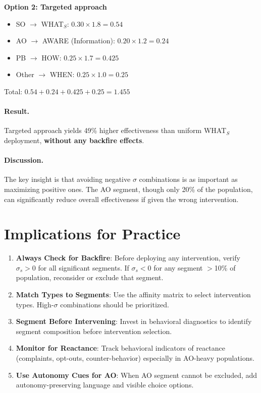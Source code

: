 \textbf{Option 2: Targeted approach}
\begin{itemize}
\item SO $\rightarrow$ WHAT$_S$: $0.30 \times 1.8 = 0.54$
\item AO $\rightarrow$ AWARE (Information): $0.20 \times 1.2 = 0.24$
\item PB $\rightarrow$ HOW: $0.25 \times 1.7 = 0.425$
\item Other $\rightarrow$ WHEN: $0.25 \times 1.0 = 0.25$
\end{itemize}
Total: $0.54 + 0.24 + 0.425 + 0.25 = 1.455$

\paragraph{Result.} Targeted approach yields 49\% higher effectiveness than uniform
WHAT$_S$ deployment, \textbf{without any backfire effects}.

\paragraph{Discussion.} The key insight is that avoiding negative $\sigma$
combinations is as important as maximizing positive ones. The AO segment, though
only 20\% of the population, can significantly reduce overall effectiveness if
given the wrong intervention.


\section{Implications for Practice}
\label{sec:qq-practice}

\begin{tcolorbox}[colback=green!5!white, colframe=green!75!black,
    title=Practical Implications]
\begin{enumerate}
\item \textbf{Always Check for Backfire}: Before deploying any intervention,
verify $\sigma_s > 0$ for all significant segments. If $\sigma_s < 0$ for any
segment $>$10\% of population, reconsider or exclude that segment.

\item \textbf{Match Types to Segments}: Use the affinity matrix to select
intervention types. High-$\sigma$ combinations should be prioritized.

\item \textbf{Segment Before Intervening}: Invest in behavioral diagnostics
to identify segment composition before intervention selection.

\item \textbf{Monitor for Reactance}: Track behavioral indicators of reactance
(complaints, opt-outs, counter-behavior) especially in AO-heavy populations.

\item \textbf{Use Autonomy Cues for AO}: When AO segment cannot be excluded,
add autonomy-preserving language and visible choice options.
\end{enumerate}
\end{tcolorbox}


